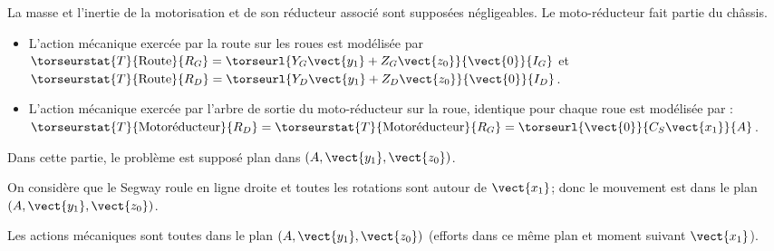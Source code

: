 La masse et l’inertie de la motorisation et de son réducteur associé sont supposées négligeables. Le moto-réducteur fait partie du châssis.
\begin{itemize}
\item L’action mécanique exercée par la route sur les roues est modélisée par  
$\torseurstat{T}{\text{Route}}{R_G} = \torseurl{Y_G\vect{y_1}+Z_G\vect{z_0}}{\vect{0}}{I_G}$
 et  
$\torseurstat{T}{\text{Route}}{R_D} = \torseurl{Y_D\vect{y_1}+Z_D\vect{z_0}}{\vect{0}}{I_D}$.
\item L’action mécanique exercée par l'arbre de sortie du moto-réducteur sur la roue, identique pour chaque roue est modélisée par :  
$\torseurstat{T}{\text{Motoréducteur}}{R_D}
= \torseurstat{T}{\text{Motoréducteur}}{R_G}
 = \torseurl{\vect{0}}{C_S\vect{x_1}}{A}$.
 \end{itemize}
Dans cette partie, le problème est supposé plan dans $\left(A,\vect{y_1},\vect{z_0}\right)$.

\fi
{}
\ifprof
\begin{corrige}
On considère que le Segway roule en ligne droite et toutes les rotations sont autour de $\vect{x_1}$; donc le mouvement est dans le plan $\left(A,\vect{y_1},\vect{z_0}\right)$.

Les actions mécaniques sont toutes dans le plan $\left(A,\vect{y_1},\vect{z_0}\right)$ (efforts dans ce même plan et moment suivant $\vect{x_1}$).


\end{corrige}
\else
\fi

